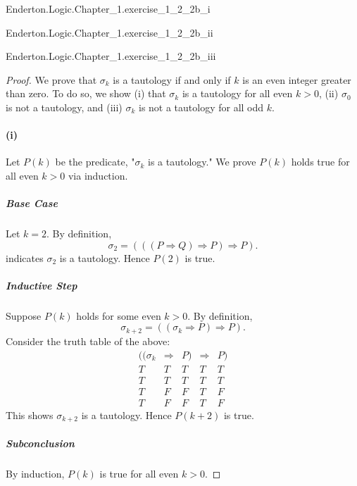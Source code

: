 \documentclass{report}
\begin{document}
    {Enderton.Logic.Chapter\_1.exercise\_1\_2\_2b\_i}

    {Enderton.Logic.Chapter\_1.exercise\_1\_2\_2b\_ii}

    {Enderton.Logic.Chapter\_1.exercise\_1\_2\_2b\_iii}

  \begin{proof}

    We prove that $\sigma_k$ is a tautology if and only if $k$ is an even
      integer greater than zero.
    To do so, we show (i) that $\sigma_k$ is a tautology for all even $k > 0$,
      (ii) $\sigma_0$ is not a tautology, and (iii) $\sigma_k$ is not a
      tautology for all odd $k$.

    \paragraph{(i)}%

      Let $P(k)$ be the predicate, "$\sigma_k$ is a tautology."
      We prove $P(k)$ holds true for all even $k > 0$ via induction.

      \subparagraph{Base Case}%

        Let $k = 2$.
        By definition,
          $$\sigma_2 = (((P \Rightarrow Q) \Rightarrow P) \Rightarrow P).$$
         indicates $\sigma_2$ is a tautology.
        Hence $P(2)$ is true.

      \subparagraph{Inductive Step}%

        Suppose $P(k)$ holds for some even $k > 0$.
        By definition,
          $$\sigma_{k + 2} = ((\sigma_{k} \Rightarrow P) \Rightarrow P).$$
        Consider the truth table of the above:
          $$\begin{array}{c|c|s|e|s}
            ((\sigma_k & \Rightarrow & P) & \Rightarrow & P) \\
            \hline
            T & T & T & T & T \\
            T & T & T & T & T \\
            T & F & F & T & F \\
            T & F & F & T & F
          \end{array}$$
        This shows $\sigma_{k+2}$ is a tautology.
        Hence $P(k + 2)$ is true.

      \subparagraph{Subconclusion}%

        By induction, $P(k)$ is true for all even $k > 0$.


\end{proof}
\end{document}

